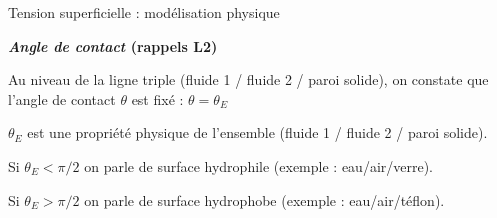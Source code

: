 \begin{frame}{Tension superficielle : modélisation physique}
\pause

\smallskip

{\bf  \textsl{Angle de contact} (rappels L2)}

Au niveau de la ligne triple (fluide 1 / fluide 2 / paroi solide), on constate que l'angle de contact $\theta$ est fixé : $\theta = \theta_E$

$\theta_E$ est une propriété physique de l'ensemble  (fluide 1 / fluide 2 / paroi solide). 

Si $\theta_E < \pi/2$ on parle de surface hydrophile (exemple : eau/air/verre).

Si $\theta_E > \pi/2$ on parle de surface hydrophobe (exemple : eau/air/téflon).

\end{frame}

